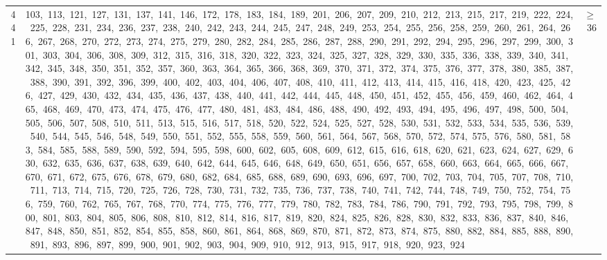 \begin{longtable}{c|p{}|r}
441 & 103,\ 113,\ 121,\ 127,\ 131,\ 137,\ 141,\ 146,\ 172,\ 178,\ 183,\ 184,\ 189,\ 201,\ 206,\ 207,\ 209,\ 210,\ 212,\ 213,\ 215,\ 217,\ 219,\ 222,\ 224,\ 225,\ 228,\ 231,\ 234,\ 236,\ 237,\ 238,\ 240,\ 242,\ 243,\ 244,\ 245,\ 247,\ 248,\ 249,\ 253,\ 254,\ 255,\ 256,\ 258,\ 259,\ 260,\ 261,\ 264,\ 266,\ 267,\ 268,\ 270,\ 272,\ 273,\ 274,\ 275,\ 279,\ 280,\ 282,\ 284,\ 285,\ 286,\ 287,\ 288,\ 290,\ 291,\ 292,\ 294,\ 295,\ 296,\ 297,\ 299,\ 300,\ 301,\ 303,\ 304,\ 306,\ 308,\ 309,\ 312,\ 315,\ 316,\ 318,\ 320,\ 322,\ 323,\ 324,\ 325,\ 327,\ 328,\ 329,\ 330,\ 335,\ 336,\ 338,\ 339,\ 340,\ 341,\ 342,\ 345,\ 348,\ 350,\ 351,\ 352,\ 357,\ 360,\ 363,\ 364,\ 365,\ 366,\ 368,\ 369,\ 370,\ 371,\ 372,\ 374,\ 375,\ 376,\ 377,\ 378,\ 380,\ 385,\ 387,\ 388,\ 390,\ 391,\ 392,\ 396,\ 399,\ 400,\ 402,\ 403,\ 404,\ 406,\ 407,\ 408,\ 410,\ 411,\ 412,\ 413,\ 414,\ 415,\ 416,\ 418,\ 420,\ 423,\ 425,\ 426,\ 427,\ 429,\ 430,\ 432,\ 434,\ 435,\ 436,\ 437,\ 438,\ 440,\ 441,\ 442,\ 444,\ 445,\ 448,\ 450,\ 451,\ 452,\ 455,\ 456,\ 459,\ 460,\ 462,\ 464,\ 465,\ 468,\ 469,\ 470,\ 473,\ 474,\ 475,\ 476,\ 477,\ 480,\ 481,\ 483,\ 484,\ 486,\ 488,\ 490,\ 492,\ 493,\ 494,\ 495,\ 496,\ 497,\ 498,\ 500,\ 504,\ 505,\ 506,\ 507,\ 508,\ 510,\ 511,\ 513,\ 515,\ 516,\ 517,\ 518,\ 520,\ 522,\ 524,\ 525,\ 527,\ 528,\ 530,\ 531,\ 532,\ 533,\ 534,\ 535,\ 536,\ 539,\ 540,\ 544,\ 545,\ 546,\ 548,\ 549,\ 550,\ 551,\ 552,\ 555,\ 558,\ 559,\ 560,\ 561,\ 564,\ 567,\ 568,\ 570,\ 572,\ 574,\ 575,\ 576,\ 580,\ 581,\ 583,\ 584,\ 585,\ 588,\ 589,\ 590,\ 592,\ 594,\ 595,\ 598,\ 600,\ 602,\ 605,\ 608,\ 609,\ 612,\ 615,\ 616,\ 618,\ 620,\ 621,\ 623,\ 624,\ 627,\ 629,\ 630,\ 632,\ 635,\ 636,\ 637,\ 638,\ 639,\ 640,\ 642,\ 644,\ 645,\ 646,\ 648,\ 649,\ 650,\ 651,\ 656,\ 657,\ 658,\ 660,\ 663,\ 664,\ 665,\ 666,\ 667,\ 670,\ 671,\ 672,\ 675,\ 676,\ 678,\ 679,\ 680,\ 682,\ 684,\ 685,\ 688,\ 689,\ 690,\ 693,\ 696,\ 697,\ 700,\ 702,\ 703,\ 704,\ 705,\ 707,\ 708,\ 710,\ 711,\ 713,\ 714,\ 715,\ 720,\ 725,\ 726,\ 728,\ 730,\ 731,\ 732,\ 735,\ 736,\ 737,\ 738,\ 740,\ 741,\ 742,\ 744,\ 748,\ 749,\ 750,\ 752,\ 754,\ 756,\ 759,\ 760,\ 762,\ 765,\ 767,\ 768,\ 770,\ 774,\ 775,\ 776,\ 777,\ 779,\ 780,\ 782,\ 783,\ 784,\ 786,\ 790,\ 791,\ 792,\ 793,\ 795,\ 798,\ 799,\ 800,\ 801,\ 803,\ 804,\ 805,\ 806,\ 808,\ 810,\ 812,\ 814,\ 816,\ 817,\ 819,\ 820,\ 824,\ 825,\ 826,\ 828,\ 830,\ 832,\ 833,\ 836,\ 837,\ 840,\ 846,\ 847,\ 848,\ 850,\ 851,\ 852,\ 854,\ 855,\ 858,\ 860,\ 861,\ 864,\ 868,\ 869,\ 870,\ 871,\ 872,\ 873,\ 874,\ 875,\ 880,\ 882,\ 884,\ 885,\ 888,\ 890,\ 891,\ 893,\ 896,\ 897,\ 899,\ 900,\ 901,\ 902,\ 903,\ 904,\ 909,\ 910,\ 912,\ 913,\ 915,\ 917,\ 918,\ 920,\ 923,\ 924 & $\ge$ 36 \\

\end{longtable}
